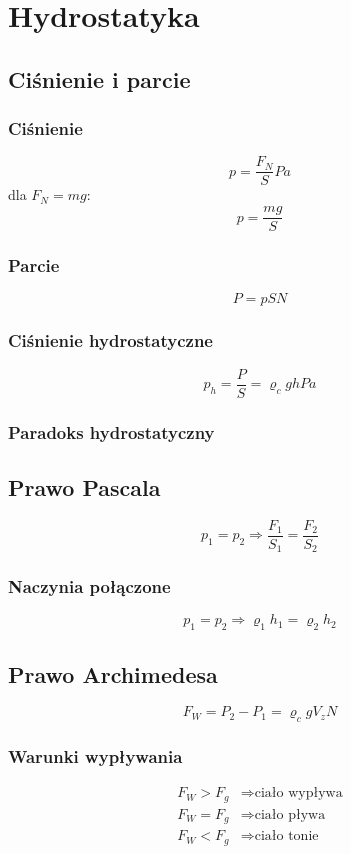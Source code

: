 \chapter{Hydrostatyka}
  \section{Ciśnienie i parcie}
    \subsection{Ciśnienie}
      \begin{equation}
        p = \frac{F_N}{S} \unit{Pa}
      \end{equation}
      dla $F_N = mg$:
      \begin{equation}
        p = \frac{mg}{S}
      \end{equation}
    \subsection{Parcie}
      \begin{equation}
        P = pS \unit{N}
      \end{equation}
    \subsection{Ciśnienie hydrostatyczne}
      \begin{equation}
        p_h = \frac{P}{S} = \varrho_cgh \unit{Pa}
      \end{equation}
    \subsection{Paradoks hydrostatyczny}
  \section{Prawo Pascala}
    \begin{equation}
      p_1 = p_2 \Rightarrow \frac{F_1}{S_1} = \frac{F_2}{S_2}
    \end{equation}
    \subsection{Naczynia połączone}
      \begin{equation}
        p_1 = p_2 \Rightarrow \varrho_1h_1 = \varrho_2h_2
      \end{equation}
  \section{Prawo Archimedesa}
    \begin{equation}
      F_W = P_2 - P_1 = \varrho_cgV_z \unit{N}
    \end{equation}
    \subsection{Warunki wypływania}
      \begin{align*}
        F_W > F_g &\Rightarrow \text{ciało wypływa}\\
        F_W = F_g &\Rightarrow \text{ciało pływa}\\
        F_W < F_g &\Rightarrow \text{ciało tonie}
      \end{align*}
